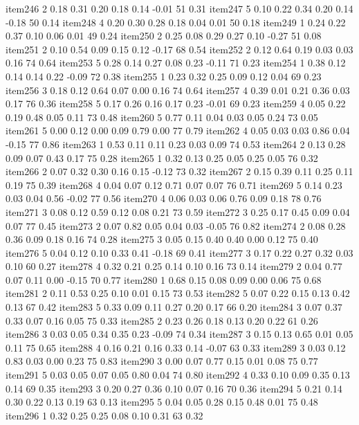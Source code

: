 \documentclass[10pt,man]{apa6}\usepackage{graphicx, color}
\begin{document}
\begin{Schunk}
\begin{Soutput}
item246   2 0.18 0.31 0.20 0.18 0.14 -0.01 51 0.31
item247   5 0.10 0.22 0.34 0.20 0.14 -0.18 50 0.14
item248   4 0.20 0.30 0.28 0.18 0.04  0.01 50 0.18
item249   1 0.24 0.22 0.37 0.10 0.06  0.01 49 0.24
item250   2 0.25 0.08 0.29 0.27 0.10 -0.27 51 0.08
item251   2 0.10 0.54 0.09 0.15 0.12 -0.17 68 0.54
item252   2 0.12 0.64 0.19 0.03 0.03  0.16 74 0.64
item253   5 0.28 0.14 0.27 0.08 0.23 -0.11 71 0.23
item254   1 0.38 0.12 0.14 0.14 0.22 -0.09 72 0.38
item255   1 0.23 0.32 0.25 0.09 0.12  0.04 69 0.23
item256   3 0.18 0.12 0.64 0.07 0.00  0.16 74 0.64
item257   4 0.39 0.01 0.21 0.36 0.03  0.17 76 0.36
item258   5 0.17 0.26 0.16 0.17 0.23 -0.01 69 0.23
item259   4 0.05 0.22 0.19 0.48 0.05  0.11 73 0.48
item260   5 0.77 0.11 0.04 0.03 0.05  0.24 73 0.05
item261   5 0.00 0.12 0.00 0.09 0.79  0.00 77 0.79
item262   4 0.05 0.03 0.03 0.86 0.04 -0.15 77 0.86
item263   1 0.53 0.11 0.11 0.23 0.03  0.09 74 0.53
item264   2 0.13 0.28 0.09 0.07 0.43  0.17 75 0.28
item265   1 0.32 0.13 0.25 0.05 0.25  0.05 76 0.32
item266   2 0.07 0.32 0.30 0.16 0.15 -0.12 73 0.32
item267   2 0.15 0.39 0.11 0.25 0.11  0.19 75 0.39
item268   4 0.04 0.07 0.12 0.71 0.07  0.07 76 0.71
item269   5 0.14 0.23 0.03 0.04 0.56 -0.02 77 0.56
item270   4 0.06 0.03 0.06 0.76 0.09  0.18 78 0.76
item271   3 0.08 0.12 0.59 0.12 0.08  0.21 73 0.59
item272   3 0.25 0.17 0.45 0.09 0.04  0.07 77 0.45
item273   2 0.07 0.82 0.05 0.04 0.03 -0.05 76 0.82
item274   2 0.08 0.28 0.36 0.09 0.18  0.16 74 0.28
item275   3 0.05 0.15 0.40 0.40 0.00  0.12 75 0.40
item276   5 0.04 0.12 0.10 0.33 0.41 -0.18 69 0.41
item277   3 0.17 0.22 0.27 0.32 0.03  0.10 60 0.27
item278   4 0.32 0.21 0.25 0.14 0.10  0.16 73 0.14
item279   2 0.04 0.77 0.07 0.11 0.00 -0.15 70 0.77
item280   1 0.68 0.15 0.08 0.09 0.00  0.06 75 0.68
item281   2 0.11 0.53 0.25 0.10 0.01  0.15 73 0.53
item282   5 0.07 0.22 0.15 0.13 0.42  0.13 67 0.42
item283   5 0.33 0.09 0.11 0.27 0.20  0.17 66 0.20
item284   3 0.07 0.37 0.33 0.07 0.16  0.05 75 0.33
item285   2 0.23 0.26 0.18 0.13 0.20  0.22 61 0.26
item286   3 0.03 0.05 0.34 0.35 0.23 -0.09 74 0.34
item287   3 0.15 0.13 0.65 0.01 0.05  0.11 75 0.65
item288   4 0.16 0.21 0.16 0.33 0.14 -0.07 63 0.33
item289   3 0.03 0.12 0.83 0.03 0.00  0.23 75 0.83
item290   3 0.00 0.07 0.77 0.15 0.01  0.08 75 0.77
item291   5 0.03 0.05 0.07 0.05 0.80  0.04 74 0.80
item292   4 0.33 0.10 0.09 0.35 0.13  0.14 69 0.35
item293   3 0.20 0.27 0.36 0.10 0.07  0.16 70 0.36
item294   5 0.21 0.14 0.30 0.22 0.13  0.19 63 0.13
item295   5 0.04 0.05 0.28 0.15 0.48  0.01 75 0.48
item296   1 0.32 0.25 0.25 0.08 0.10  0.31 63 0.32

\end{Soutput}
\end{Schunk}
\end{document}
